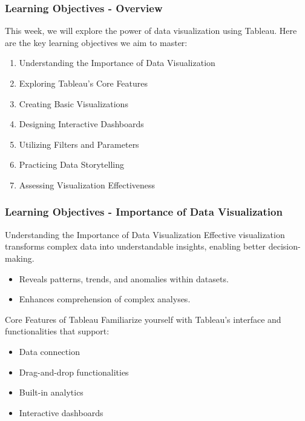 \documentclass[aspectratio=169]{beamer}
\begin{document}
\begin{frame}[fragile]
    \frametitle{Learning Objectives - Overview}
    This week, we will explore the power of data visualization using Tableau.  
    Here are the key learning objectives we aim to master:
    \begin{enumerate}
        \item Understanding the Importance of Data Visualization
        \item Exploring Tableau's Core Features
        \item Creating Basic Visualizations
        \item Designing Interactive Dashboards
        \item Utilizing Filters and Parameters
        \item Practicing Data Storytelling
        \item Assessing Visualization Effectiveness
    \end{enumerate}
\end{frame}

\begin{frame}[fragile]
    \frametitle{Learning Objectives - Importance of Data Visualization}
    \begin{block}{Understanding the Importance of Data Visualization}
        Effective visualization transforms complex data into understandable insights, enabling better decision-making.
        \begin{itemize}
            \item Reveals patterns, trends, and anomalies within datasets.
            \item Enhances comprehension of complex analyses.
        \end{itemize}
    \end{block}
    
    \begin{block}{Core Features of Tableau}
        Familiarize yourself with Tableau's interface and functionalities that support:
        \begin{itemize}
            \item Data connection
            \item Drag-and-drop functionalities
            \item Built-in analytics
            \item Interactive dashboards
        \end{itemize}
    \end{block}
\end{frame}
\end{document}
